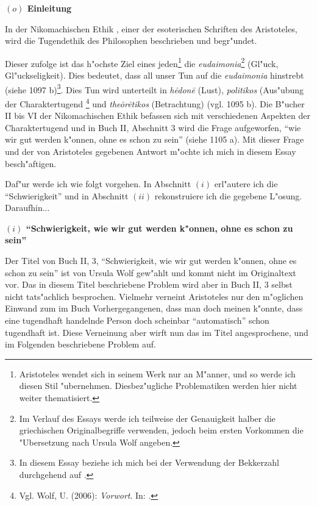 \documentclass[a4paper, emulatestandardclasses, 12pt]{scrartcl}
\begin{document}
\begin{onehalfspace} 



\noindent\textbf{$(o)$ Einleitung}

\noindent In der Nikomachischen Ethik \citep{wolf2006nikomachische}, einer der esoterischen Schriften des Aristoteles, wird die Tugendethik des Philosophen beschrieben und begr"undet.

Dieser zufolge ist das h"ochste Ziel eines jeden\footnote{Aristoteles wendet sich in seinem Werk nur an M"anner, und so werde ich diesen Stil "ubernehmen. Diesbez"ugliche Problematiken werden hier nicht weiter thematisiert.} die \emph{eudaimonia}\footnote{Im Verlauf des Essays werde ich teilweise der Genauigkeit halber die griechischen Originalbegriffe verwenden, jedoch beim ersten Vorkommen die "Ubersetzung nach Ursula Wolf angeben.} (Gl"uck, Gl"uckseligkeit). Dies bedeutet, dass all unser Tun auf die \emph{eudaimonia} hinstrebt (siehe 1097 b)\footnote{In diesem Essay beziehe ich mich bei der Verwendung der Bekkerzahl durchgehend auf \citep{wolf2006nikomachische}.}. Dies Tun wird unterteilt in \emph{h\={e}don\={e}} (Lust), \emph{politikos} (Aus"ubung der Charaktertugend \footnote{Vgl. Wolf, U. (2006): \emph{Vorwort}. In: \citep{wolf2006nikomachische}.} %
 und \emph{the\={o}r\={e}tikos} (Betrachtung) (vgl. 1095 b). Die B"ucher II bis VI der Nikomachischen Ethik befassen sich mit verschiedenen Aspekten der Charaktertugend und in Buch II, Abschnitt 3 wird die Frage aufgeworfen, "`wie wir gut werden k"onnen, ohne es schon zu sein"' (siehe 1105 a). Mit dieser Frage und der von Aristoteles gegebenen Antwort m"ochte ich mich in diesem Essay besch"aftigen.\newline

Daf"ur werde ich wie folgt vorgehen. In Abschnitt $(i)$ erl"autere ich die "`Schwierigkeit"' und in Abschnitt $(ii)$ rekonstruiere ich die gegebene L"osung. Daraufhin...

\vspace{5mm}

\noindent\textbf{$(i)$ "`Schwierigkeit, wie wir gut werden k"onnen, ohne es schon zu sein"'}

\noindent Der Titel von Buch II, 3, "`Schwierigkeit, wie wir gut werden k"onnen, ohne es schon zu sein"' ist von Ursula Wolf gew"ahlt und kommt nicht im Originaltext vor. Das in diesem Titel beschriebene Problem wird aber in Buch II, 3 selbst nicht tats"achlich besprochen. Vielmehr verneint Aristoteles nur den m"oglichen Einwand zum im Buch Vorhergegangenen, dass man doch meinen k"onnte, dass eine tugendhaft handelnde Person doch scheinbar "`automatisch"' schon tugendhaft ist. Diese Verneinung aber wirft nun das im Titel angesprochene, und im Folgenden beschriebene Problem auf.


\end{onehalfspace}
\end{document}
